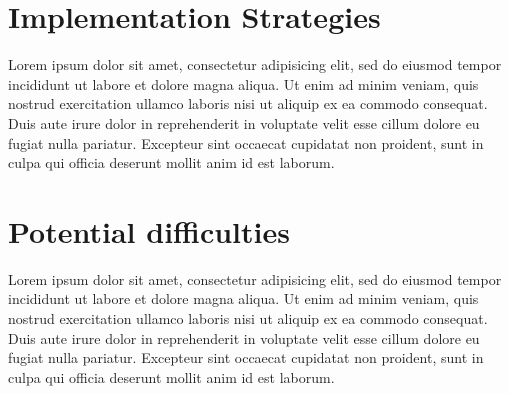 \documentclass[11pt]{article}
\begin{document}
\section{Implementation Strategies}

Lorem ipsum dolor sit amet, consectetur adipisicing elit, sed do eiusmod tempor
incididunt ut labore et dolore magna aliqua. Ut enim ad minim veniam, quis
nostrud exercitation ullamco laboris nisi ut aliquip ex ea commodo consequat.
Duis aute irure dolor in reprehenderit in voluptate velit esse cillum dolore eu
fugiat nulla pariatur. Excepteur sint occaecat cupidatat non proident, sunt in
culpa qui officia deserunt mollit anim id est laborum.

\section{Potential difficulties}
Lorem ipsum dolor sit amet, consectetur adipisicing elit, sed do eiusmod tempor
incididunt ut labore et dolore magna aliqua. Ut enim ad minim veniam, quis
nostrud exercitation ullamco laboris nisi ut aliquip ex ea commodo consequat.
Duis aute irure dolor in reprehenderit in voluptate velit esse cillum dolore eu
fugiat nulla pariatur. Excepteur sint occaecat cupidatat non proident, sunt in
culpa qui officia deserunt mollit anim id est laborum.
\end{document}
